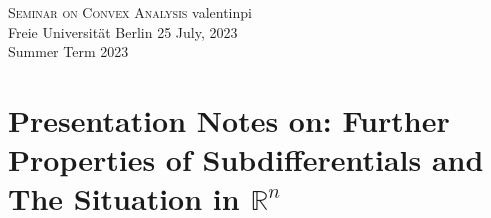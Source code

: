 \documentclass[10pt, leqno]{amsart}
\theoremstyle{definition}
\theoremstyle{remark}
\newcommand{\commentcmd}[1]{}
\begin{document}
    \begin{mdframed}
        \textsc{Seminar on Convex Analysis} \hfill valentinpi\\
        Freie Universität Berlin \hfill 25 July, 2023\\
        Summer Term 2023
    \end{mdframed}

    \section*{Presentation Notes on: Further Properties of Subdifferentials and The Situation in \(\mathbb{R}^n\)}

    \phantom{}

    \commentcmd{
    \begin{center}
        \colorbox{green!15}{
            \begin{minipage}{0.95\linewidth}
                \centering
                
                \paragraph*{\textbf{\textcolor{red}{Remarks for the Meeting with Prof. Thomas}}}
                

\end{minipage}}
\end{center}}
\end{document}
